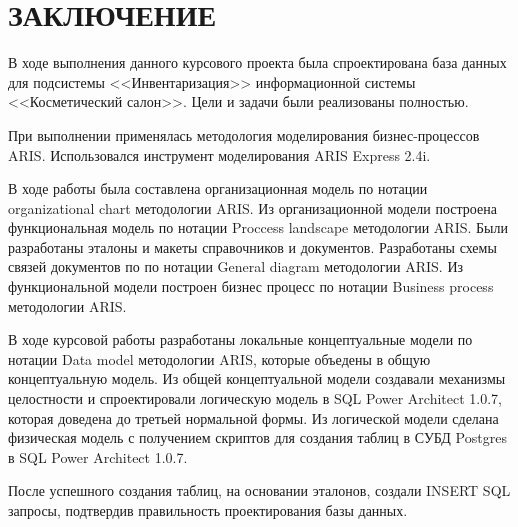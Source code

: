 {}
\section*{ЗАКЛЮЧЕНИЕ}

В ходе выполнения данного курсового проекта была спроектирована база данных
для подсистемы <<Инвентаризация>> информационной системы <<Косметический салон>>.
Цели и задачи были реализованы полностью.

При выполнении применялась методология моделирования бизнес-процессов ARIS.
Использовался инструмент моделирования ARIS Express 2.4i.

В ходе работы была составлена организационная модель по нотации organizational chart методологии ARIS.
Из организационной модели построена функциональная модель по нотации Proccess landscape методологии ARIS.
Были разработаны эталоны и макеты справочников и документов.
Разработаны схемы связей документов по по нотации General diagram методологии ARIS.
Из функциональной модели построен бизнес процесс по нотации Business process методологии ARIS.

В ходе курсовой работы разработаны локальные концептуальные модели по нотации Data model методологии ARIS,
которые объедены в общую концептуальную модель. 
Из общей концептуальной модели создавали механизмы целостности и спроектировали
логическую модель в SQL Power Architect 1.0.7, которая доведена до третьей нормальной формы.
Из логической модели сделана физическая модель с получением скриптов для создания
таблиц в СУБД Postgres в SQL Power Architect 1.0.7.

После успешного создания таблиц, на основании эталонов, создали INSERT SQL запросы,
подтвердив правильность проектирования базы данных.

\newpage
